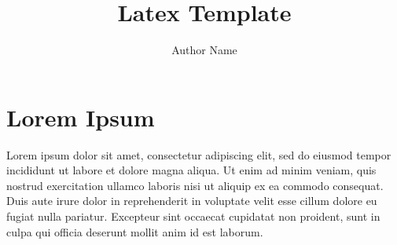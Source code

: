 \documentclass{article}
\title{Latex Template}
\author{
    Author Name
}
\begin{document}
\twocolumn
\maketitle

\section{Lorem Ipsum}

Lorem ipsum dolor sit amet, consectetur adipiscing elit, sed do eiusmod tempor incididunt ut labore et dolore magna aliqua. Ut enim ad minim veniam, quis nostrud exercitation ullamco laboris nisi ut aliquip ex ea commodo consequat. Duis aute irure dolor in reprehenderit in voluptate velit esse cillum dolore eu fugiat nulla pariatur. Excepteur sint occaecat cupidatat non proident, sunt in culpa qui officia deserunt mollit anim id est laborum\cite{book_example}.

\begin{equation}
	\label{equ:pagerank}
\end{equation}

\onecolumn

\nocite{*}


\end{document}
